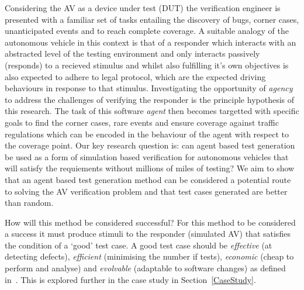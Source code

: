 \documentclass[letterpaper, 10 pt, journal, twoside]{IEEEtran}
\begin{document}
Considering the AV as a device under test (DUT) the verification engineer is presented with a familiar set of tasks entailing the discovery of bugs, corner cases, unanticipated events and to reach complete coverage. %
%
A suitable analogy of the autonomous vehicle in this context is that of a responder which interacts with an abstracted level of the testing environment and only interacts passively (responds) to a recieved stimulus and whilst also fulfilling it's own objectives is also expected to adhere to legal protocol, which are the expected driving behaviours in response to that stimulus.
%
Investigating the opportunity of \textit{agency} to address the challenges of verifying the responder is the principle hypothesis of this research. The task of this software \textit{agent} then becomes targetted with specific goals to find the corner cases, rare events and ensure coverage against traffic regulations which can be encoded in the behaviour of the agent with respect to the coverage point. %
%
Our key research question is: can agent based test generation be used as a form of simulation based verification for autonomous vehicles that will satisfy the requiements without millions of miles of testing? %
%
We aim to show that an agent based test generation method can be considered a potential route to solving the AV verification problem and that test cases generated are better than random.

How will this method be considered successful? For this method to be considered a success it must produce stimuli to the responder (simulated AV) that satisfies the condition of a `good' test case. 
%
%
A good test case should be \textit{effective} (at detecting defects), \textit{efficient} (minimising the number if tests), \textit{economic} (cheap to perform and analyse) and \textit{evolvable} (adaptable to software changes) as defined in~\cite{fewster1999software}. This is explored further in the case study in Section~\ref{CaseStudy}.
\end{document}
